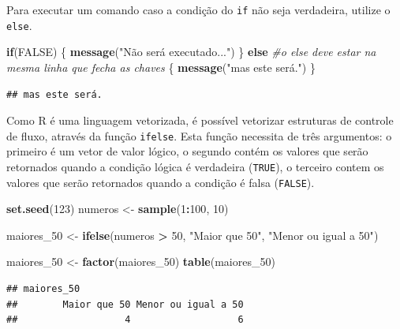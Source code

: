 \documentclass[
]{book}
\newenvironment{Shaded}{\begin{snugshade}}{\end{snugshade}}
\newcommand{\CommentTok}[1]{\textcolor[rgb]{0.56,0.35,0.01}{\textit{#1}}}
\newcommand{\ConstantTok}[1]{\textcolor[rgb]{0.56,0.35,0.01}{#1}}
\newcommand{\ControlFlowTok}[1]{\textcolor[rgb]{0.13,0.29,0.53}{\textbf{#1}}}
\newcommand{\DecValTok}[1]{\textcolor[rgb]{0.00,0.00,0.81}{#1}}
\newcommand{\FunctionTok}[1]{\textcolor[rgb]{0.13,0.29,0.53}{\textbf{#1}}}
\newcommand{\NormalTok}[1]{#1}
\newcommand{\OtherTok}[1]{\textcolor[rgb]{0.56,0.35,0.01}{#1}}
\newcommand{\SpecialCharTok}[1]{\textcolor[rgb]{0.81,0.36,0.00}{\textbf{#1}}}
\newcommand{\StringTok}[1]{\textcolor[rgb]{0.31,0.60,0.02}{#1}}
\begin{document}
Para executar um comando caso a condição do \texttt{if} não seja verdadeira, utilize o \texttt{else}.

\begin{Shaded}
\begin{Highlighting}[]
\ControlFlowTok{if}\NormalTok{(}\ConstantTok{FALSE}\NormalTok{)}
\NormalTok{\{}
   \FunctionTok{message}\NormalTok{(}\StringTok{"Não será executado..."}\NormalTok{)}
\NormalTok{\} }\ControlFlowTok{else} \CommentTok{\#o else deve estar na mesma linha que fecha as chaves}
\NormalTok{\{}
   \FunctionTok{message}\NormalTok{(}\StringTok{"mas este será."}\NormalTok{)}
\NormalTok{\}}
\end{Highlighting}
\end{Shaded}

\begin{verbatim}
## mas este será.
\end{verbatim}

Como R é uma linguagem vetorizada, é possível vetorizar estruturas de controle de fluxo, através da função \texttt{ifelse}.
Esta função necessita de três argumentos: o primeiro é um vetor de valor lógico, o segundo contém os valores que serão retornados quando a condição lógica é verdadeira (\texttt{TRUE}), o terceiro contem os valores que serão retornados quando a condição é falsa (\texttt{FALSE}).

\begin{Shaded}
\begin{Highlighting}[]
\FunctionTok{set.seed}\NormalTok{(}\DecValTok{123}\NormalTok{)}
\NormalTok{numeros }\OtherTok{\textless{}{-}} \FunctionTok{sample}\NormalTok{(}\DecValTok{1}\SpecialCharTok{:}\DecValTok{100}\NormalTok{, }\DecValTok{10}\NormalTok{)}

\NormalTok{maiores\_50 }\OtherTok{\textless{}{-}} \FunctionTok{ifelse}\NormalTok{(numeros }\SpecialCharTok{\textgreater{}} \DecValTok{50}\NormalTok{, }\StringTok{"Maior que 50"}\NormalTok{, }\StringTok{"Menor ou igual a 50"}\NormalTok{)}

\NormalTok{maiores\_50 }\OtherTok{\textless{}{-}} \FunctionTok{factor}\NormalTok{(maiores\_50)}
\FunctionTok{table}\NormalTok{(maiores\_50)}
\end{Highlighting}
\end{Shaded}

\begin{verbatim}
## maiores_50
##        Maior que 50 Menor ou igual a 50 
##                   4                   6
\end{verbatim}
\end{document}
